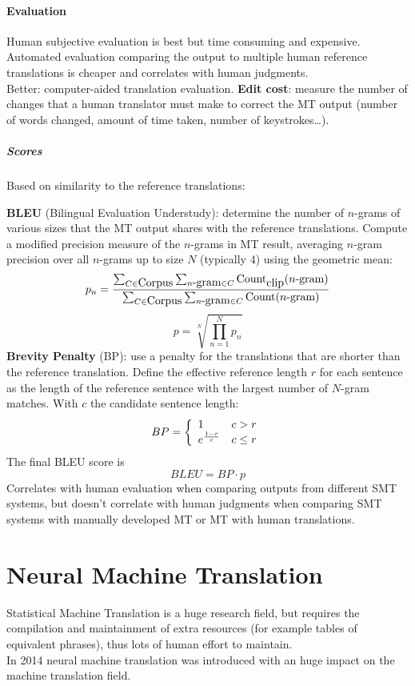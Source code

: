 \documentclass[10pt]{report}
\begin{document}
\paragraph{Evaluation} Human subjective evaluation is best but time consuming and expensive. Automated evaluation comparing the output to multiple human reference translations is cheaper and correlates with human judgments.\\
Better: computer-aided translation evaluation. \textbf{Edit cost}: measure the number of changes that a human translator must make to correct the MT output (number of words changed, amount of time taken, number of keystrokes\ldots).
\subparagraph{Scores} Based on similarity to the reference translations:
\begin{list}{}{}
	\item \textbf{BLEU} (Bilingual Evaluation Understudy): determine the number of $n$-grams of various sizes that the MT output shares with the reference translations. Compute a modified precision measure of the $n$-grams in MT result, averaging $n$-gram precision over all $n$-grams up to size $N$ (typically 4) using the geometric mean:
	$$p_n = \frac{\sum_{C\in\hbox{Corpus}}\sum_{n\hbox{-gram}\in C}\hbox{Count}_{\hbox{clip}}(n\hbox{-gram})}{\sum_{C\in\hbox{Corpus}}\sum_{n\hbox{-gram}\in C}\hbox{Count}(n\hbox{-gram})}$$
	$$p = \sqrt[N]{\prod_{n=1}^Np_n}$$
	\textbf{Brevity Penalty} (BP): use a penalty for the translations that are shorter than the reference translation. Define the effective reference length $r$ for each sentence as the length of the reference sentence with the largest number of $N$-gram matches. With $c$ the candidate sentence length:
	$$BP = \left\{\begin{array}{l l}
	1&c > r\\
	e^{\frac{1-r}{c}}& c\leq r
	\end{array}\right.$$
	The final BLEU score is 
	$$BLEU = BP\cdot p$$
	Correlates with human evaluation when comparing outputs from different SMT systems, but doesn't correlate with human judgments when comparing SMT systems with manually developed MT or MT with human translations.
\end{list}
\section{Neural Machine Translation}
Statistical Machine Translation is a huge research field, but requires the compilation and maintainment of extra resources (for example tables of equivalent phrases), thus lots of human effort to maintain.\\
In 2014 neural machine translation was introduced with an huge impact on the machine translation field.
\end{document}
